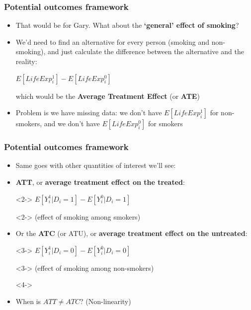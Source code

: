 \documentclass[aspectratio=43]{beamer}
\begin{document}
\begin{frame}
\frametitle{Potential outcomes framework}
\centering

\begin{itemize}
  \item That would be for Gary. What about the \textbf{`general' effect of smoking}?
  \item We'd need to find an alternative for every person (smoking and non-smoking), and just calculate the difference between the alternative and the reality:
  \item[] $E[LifeExp_{i}^{1}] - E[LifeExp_{i}^{0}]$
  \item[] which would be the \textbf{Average Treatment Effect} (or \textbf{ATE})
  \item<2-> Problem is we have missing data: we don't have $E[LifeExp_{i}^{1}]$ for non-smokers, and we don't have $E[LifeExp_{i}^{0}]$ for smokers
\end{itemize}

\end{frame}

\begin{frame}
\frametitle{Potential outcomes framework}
\centering

\begin{itemize}
  \item<1-> Same goes with other quantities of interest we'll see:
  \item<2-> \textbf{ATT}, or \textbf{average treatment effect on the treated}:
  \item[]<2-> $E[Y_{i}^{1}|D_{i} = 1] - E[Y_{i}^{0}|D_{i} = 1]$
  \item[]<2-> {\small (effect of smoking among smokers)}
  \item<3-> Or the \textbf{ATC} (or ATU), or \textbf{average treatment effect on the untreated}:
  \item[]<3-> $E[Y_{i}^{1}|D_{i} = 0] - E[Y_{i}^{0}|D_{i} = 0]$
  \item[]<3-> {\small (effect of smoking among non-smokers)}
  \item[]<4->
  \item<4-> When is $ATT \neq ATC$? {\footnotesize (Non-linearity)}
\end{itemize}

\end{frame}
\end{document}
